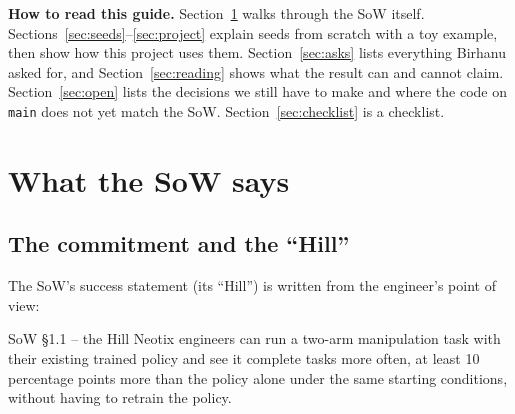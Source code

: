 \documentclass[11pt,a4paper]{article}
\begin{document}
\noindent\textbf{How to read this guide.}
Section~\ref{sec:sow} walks through the SoW itself. Sections~\ref{sec:seeds}--\ref{sec:project} explain seeds
from scratch with a toy example, then show how this project uses them. Section~\ref{sec:asks} lists everything
Birhanu asked for, and Section~\ref{sec:reading} shows what the result can and cannot claim.
Section~\ref{sec:open} lists the decisions we still have to make and where the code on \texttt{main} does not yet
match the SoW. Section~\ref{sec:checklist} is a checklist.

\begin{center}
\end{center}

\clearpage
\section{What the SoW says}\label{sec:sow}

\subsection{The commitment and the ``Hill''}

The SoW's success statement (its ``Hill'') is written from the engineer's point of view:

\begin{quotebox}{SoW \S1.1 -- the Hill}
Neotix engineers can run a two-arm manipulation task with their existing trained policy and see it complete
tasks more often, at least 10 percentage points more than the policy alone under the same starting conditions,
without having to retrain the policy.
\end{quotebox}
\end{document}
